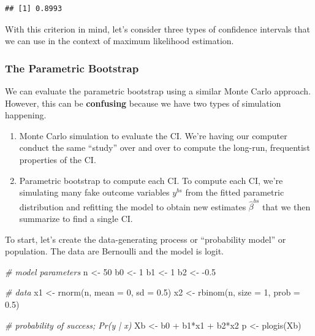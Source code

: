 \documentclass[
]{book}
\newenvironment{Shaded}{\begin{snugshade}}{\end{snugshade}}
\newcommand{\AttributeTok}[1]{\textcolor[rgb]{0.77,0.63,0.00}{#1}}
\newcommand{\CommentTok}[1]{\textcolor[rgb]{0.56,0.35,0.01}{\textit{#1}}}
\newcommand{\DecValTok}[1]{\textcolor[rgb]{0.00,0.00,0.81}{#1}}
\newcommand{\FloatTok}[1]{\textcolor[rgb]{0.00,0.00,0.81}{#1}}
\newcommand{\FunctionTok}[1]{\textcolor[rgb]{0.00,0.00,0.00}{#1}}
\newcommand{\NormalTok}[1]{#1}
\newcommand{\OtherTok}[1]{\textcolor[rgb]{0.56,0.35,0.01}{#1}}
\newcommand{\SpecialCharTok}[1]{\textcolor[rgb]{0.00,0.00,0.00}{#1}}
\providecommand{\tightlist}{%
  \setlength{\itemsep}{0pt}\setlength{\parskip}{0pt}}
\begin{document}
\begin{verbatim}
## [1] 0.8993
\end{verbatim}

With this criterion in mind, let's consider three types of confidence
intervals that we can use in the context of maximum likelihood
estimation.

\hypertarget{the-parametric-bootstrap-2}{%
\subsubsection{The Parametric
Bootstrap}\label{the-parametric-bootstrap-2}}

We can evaluate the parametric bootstrap using a similar Monte Carlo
approach. However, this can be \textbf{confusing} because we have two
types of simulation happening.

\begin{enumerate}
\def\labelenumi{\arabic{enumi}.}
\tightlist
\item
  Monte Carlo simulation to evaluate the CI. We're having our computer
  conduct the same ``study'' over and over to compute the long-run,
  frequentist properties of the CI.
\item
  Parametric bootstrap to compute each CI. To compute each CI, we're
  simulating many fake outcome variables \(y^{bs}\) from the fitted
  parametric distribution and refitting the model to obtain new
  estimates \(\hat{\beta}^{bs}\) that we then summarize to find a single
  CI.
\end{enumerate}

To start, let's create the data-generating process or ``probability
model'' or population. The data are Bernoulli and the model is logit.

\begin{Shaded}
\begin{Highlighting}[]
\CommentTok{\# model parameters}
\NormalTok{n }\OtherTok{\textless{}{-}} \DecValTok{50}
\NormalTok{b0 }\OtherTok{\textless{}{-}} \DecValTok{1}
\NormalTok{b1 }\OtherTok{\textless{}{-}} \DecValTok{1}
\NormalTok{b2 }\OtherTok{\textless{}{-}} \SpecialCharTok{{-}}\FloatTok{0.5}

\CommentTok{\# data}
\NormalTok{x1 }\OtherTok{\textless{}{-}} \FunctionTok{rnorm}\NormalTok{(n, }\AttributeTok{mean =} \DecValTok{0}\NormalTok{, }\AttributeTok{sd =} \FloatTok{0.5}\NormalTok{)}
\NormalTok{x2 }\OtherTok{\textless{}{-}} \FunctionTok{rbinom}\NormalTok{(n, }\AttributeTok{size =} \DecValTok{1}\NormalTok{, }\AttributeTok{prob =} \FloatTok{0.5}\NormalTok{)}

\CommentTok{\# probability of success; Pr(y | x)}
\NormalTok{Xb }\OtherTok{\textless{}{-}}\NormalTok{ b0 }\SpecialCharTok{+}\NormalTok{ b1}\SpecialCharTok{*}\NormalTok{x1 }\SpecialCharTok{+}\NormalTok{ b2}\SpecialCharTok{*}\NormalTok{x2}
\NormalTok{p }\OtherTok{\textless{}{-}} \FunctionTok{plogis}\NormalTok{(Xb)}
\end{Highlighting}
\end{Shaded}
\end{document}
